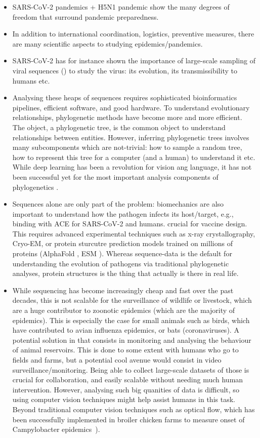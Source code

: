 \begin{itemize}
\item SARS-CoV-2 pandemics + H5N1 pandemic show the many degrees of freedom that surround pandemic preparedness.
\item In addition to international coordination, logistics, preventive measures, there are many scientific aspects to studying epidemics/pandemics. 
\item SARS-CoV-2 has for instance shown the importance of large-scale sampling of viral sequences (\cite{khurana2024}) to study the virus: its evolution, its transmissibility to humans etc.
\item Analysing these heaps of sequences requires sophisticated bioinformatics pipelines, efficient software, and good hardware. To understand evolutionary relationships, phylogenetic methods have become more and more efficient. The object, a phylogenetic tree, is the common object to understand relationships between entities. However, inferring phylogenetic trees involves many subcomponents which are not-trivial: how to sample a random tree, how to represent this tree for a computer (and a human) to understand it etc. While deep learning has been a revolution for vision ang language, it has not been successful yet for the most important analysis components of phylogenetics \cite{sapoval2022}.
\item Sequences alone are only part of the problem: biomechanics are also important to understand how the pathogen infects its host/target, e.g., binding with ACE for SARS-CoV-2 and humans. crucial for vaccine design. This requires advanced experimental techniques such as x-ray crystallography, Cryo-EM, or protein sturcutre prediction models trained on millions of proteins (AlphaFold \cite{jumper2021}, ESM \cite{lin2023}). Whereas sequence-data is the default for understanding the evolution of pathogens via traditional phylogenetic analyses, protein structures is the thing that actually is there in real life.
\item While sequencing has become increasingly cheap and fast over the past decades, this is not scalable for the surveillance of wildlife or livestock, which are a huge contributor to zoonotic epidemics (which are the majority of epidemics). This is especially the case for small animals such as birds, which have contributed to avian influenza epidemics, or bats (coronaviruses). A potential solution in that consists in monitoring and analysing the behaviour of animal reservoirs. This is done to some extent with humans who go to fields and farms, but a potential cool avenue would consist in video surveillance/monitoring. Being able to collect large-scale datasets of those is crucial for collaboration, and easily scalable without needing much human intervention. However, analysing such big quanities of data is difficult, so using computer vision techniques might help assist humans in this task. Beyond traditional computer vision techniques such as optical flow, which has been successfully implemented in broiler chicken farms to measure onset of Campylobacter epidemics~\cite{colles2016}).

\end{itemize}
